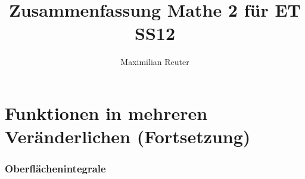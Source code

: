 \documentclass[12pt,a4paper]{article}
\author{Maximilian Reuter}
\title{Zusammenfassung Mathe 2 für ET SS12}
\begin{document}
\maketitle
\tableofcontents
\newpage

\part{Funktionen in mehreren Veränderlichen (Fortsetzung)}
\section{Oberflächenintegrale}
\end{document}
